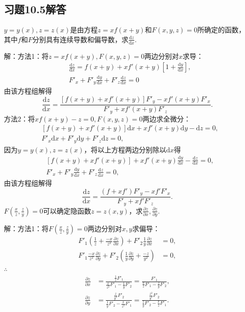 \documentclass[12pt,UTF8]{ctexart}
\begin{document}
\subsection{习题10.5解答}
\begin{enumerate}
$y=y(x),z=z(x)$是由方程$z=xf(x+y)$和$F(x,y,z)=0$所确定的函数，其中$f$和$F$分别具有连续导数和偏导数，求$\frac{\mathrm dz}{\mathrm dx}$.

解：方法1：将$z=xf(x+y),F(x,y,z)=0$两边分别对$x$求导：
\[\begin{split}
&\frac{\mathrm dz}{\mathrm dx}=f(x+y)+xf'(x+y)[1+\frac{\mathrm dy}{\mathrm dx}],\\
&F'_x+F'_y\frac{\mathrm dy}{\mathrm dx}+F'_z\frac{\mathrm dz}{\mathrm dx}=0
\end{split}\]
由该方程组解得
\[
\frac{\mathrm dz}{\mathrm dx}=\frac{[f(x+y)+xf'(x+y)]F'_y-xf'(x+y)F'_x}{F'_y+xf'(x+y)F'_z}.
\]
方法2：将$xf(x+y)-z=0,F(x,y,z)=0$两边求全微分：
\[\begin{split}
&[f(x+y)+xf'(x+y)]\mathrm dx+xf'(x+y)\mathrm dy-\mathrm dz=0,\\
&F'_x\mathrm dx+F'_y\mathrm dy+F'_z\mathrm dz=0,
\end{split}\]
因为$y=y(x),z=z(x)$，将以上方程两边分别除以$\mathrm dx$得
\[\begin{split}
&[f(x+y)+xf'(x+y)]+xf'(x+y)\frac{\mathrm dy}{\mathrm dx}-\frac{\mathrm dz}{\mathrm dx}=0,\\
&F'_x+F'_y\frac{\mathrm dy}{\mathrm dx}+F'_z\frac{\mathrm dz}{\mathrm dx}=0,
\end{split}\]
由该方程组解得
\[
\frac{\mathrm dz}{\mathrm dx}=\frac{(f+xf')F'_y-xf'F'_x}{F'_y+xf'F'_z}.
\]
$F(\frac xz,\frac zy)=0$可以确定隐函数$z=z(x,y)$，求$\frac{\partial z}{\partial x},\frac{\partial z}{\partial y}$.

解：方法1：将$F(\frac xz,\frac zy)=0$两边分别对$x,y$求偏导：
\[\begin{split}
F'_1(\frac1z+\frac{-x}{z^2}\frac{\partial z}{\partial x})+F'_2\frac1y\frac{\partial z}{\partial x}&=0,\\
F'_1\frac{-x}{z^2}\frac{\partial z}{\partial y}+F'_2(\frac1y\frac{\partial z}{\partial y}+\frac{-z}{y^2})&=0,\end{split}\]
$\therefore$
\[\begin{split}
\frac{\partial z}{\partial x}&=\frac{\frac1zF'_1}{\frac x{z^2}F'_1-\frac1yF'_2}=\frac{F'_1}{\frac xzF'_1-\frac zyF'_2},\\
\frac{\partial z}{\partial y}&=\frac{\frac z{y^2}F'_2}{\frac1yF'_2-\frac x{z^2}F'_1}=\frac{\frac{z^2}{y^2}F'_2}{\frac zyF'_2-\frac xzF'_1}.
\end{split}\]


\end{enumerate}
\end{document}
